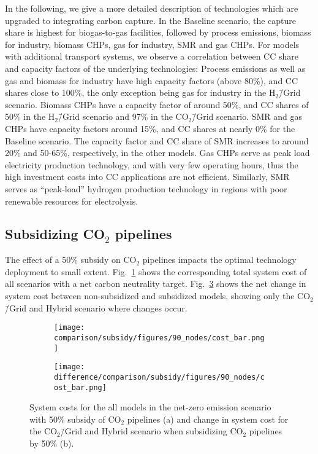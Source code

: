 \documentclass[twocolumn]{article}
\newcommand{\carbon}{CO$_2$}
\newcommand{\carbongrid}{CO$_2$\=/Grid}
\newcommand{\baselinescenario}{Baseline scenario}
\newcommand{\carbonscenario}{CO$_2$\=/Grid scenario}
\newcommand{\hydrogenscenario}{H$_2$\=/Grid scenario}
\newcommand{\hybridscenario}{Hybrid scenario}
\begin{document}
In the following, we give a more detailed description of technologies which are upgraded to integrating carbon capture.
In the \baselinescenario{}, the capture share is highest for biogas-to-gas facilities, followed by process emissions, biomass for industry, biomass CHPs, gas for industry, SMR and gas CHPs. For models with additional transport systems, we observe a correlation between CC share and capacity factors of the underlying technologies: Process emissions as well as gas and biomass for industry have high capacity factors (above 80\%), and CC shares close to 100\%, the only exception being gas for industry in the \hydrogenscenario{}. Biomass CHPs have a capacity factor of around 50\%, and CC shares of 50\% in the \hydrogenscenario{} and 97\% in the \carbonscenario{}. SMR and gas CHPs have capacity factors around 15\%, and CC shares at nearly 0\% for the \baselinescenario{}. The capacity factor and CC share of SMR increases to around 20\% and 50-65\%, respectively, in the other models. Gas CHPs serve as peak load electricity production technology, and with very few operating hours, thus the high investment costs into CC applications are not efficient. Similarly, SMR serves as ``peak-load'' hydrogen production technology in regions with poor renewable resources for electrolysis.


\subsection{Subsidizing \carbon{} pipelines}
\label{sec:subsidy}

The effect of a 50\% subsidy on \carbon{} pipelines impacts the optimal technology deployment to small extent. Fig.~\ref{fig:cost_bar_subsidy} shows the corresponding total system cost of all scenarios with a net carbon neutrality target. Fig.~\ref{fig:cost_bar_diff_subsidy} shows the net change in system cost between non-subsidized and subsidized models, showing only the \carbongrid{} and \hybridscenario{} where changes occur.

\begin{figure}[ht!]
    \centering
    \begin{subfigure}{.5\textwidth}
    \texttt{[image: comparison/subsidy/figures/90\_nodes/cost\_bar.png]}
    \caption{}
    \label{fig:cost_bar_subsidy}
\end{subfigure}%
\begin{subfigure}{.5\textwidth}
    \centering
    \texttt{[image: difference/comparison/subsidy/figures/90\_nodes/cost\_bar.png]}
    \caption{}
    \label{fig:cost_bar_diff_subsidy}
\end{subfigure}
\caption{System costs for the all models in the net-zero emission scenario with 50\% subsidy of \carbon{} pipelines (a) and change in system cost for the \carbongrid{} and \hybridscenario{} when subsidizing \carbon{} pipelines by 50\% (b).}
\end{figure}
\end{document}
